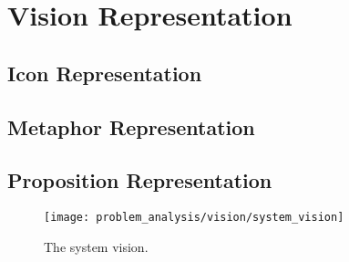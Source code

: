 \section{Vision Representation}
\subsection{Icon Representation}
\subsection{Metaphor Representation}
\subsection{Proposition Representation}
\begin{figure}[!htbp]
    \centering
    \texttt{[image: problem\_analysis/vision/system\_vision]}
    \caption{The system vision.}
    \label{fig:system_vision}
\end{figure}
\FloatBarrier